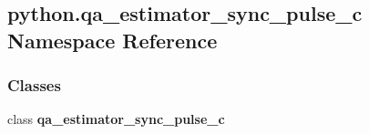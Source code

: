 \subsection{python.\+qa\+\_\+estimator\+\_\+sync\+\_\+pulse\+\_\+c Namespace Reference}
\label{namespacepython_1_1qa__estimator__sync__pulse__c}
\subsubsection*{Classes}
\begin{DoxyCompactItemize}
\item 
class {\bf qa\+\_\+estimator\+\_\+sync\+\_\+pulse\+\_\+c}
\end{DoxyCompactItemize}
